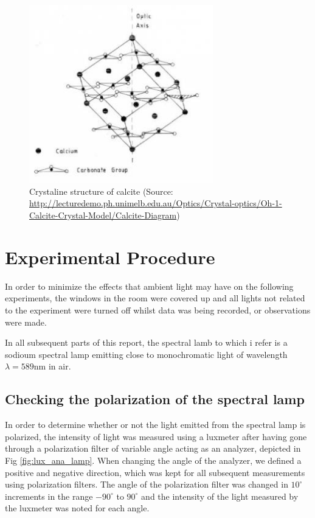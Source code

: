 \documentclass[11pt,a4paper, twocolumn]{article}
\begin{document}
    \begin{figure}[H]
      \center
      \includegraphics[width=8cm]{scripts/figs/calcite.jpg}
      \caption{Crystaline structure of calcite (Source: \url{http://lecturedemo.ph.unimelb.edu.au/Optics/Crystal-optics/Oh-1-Calcite-Crystal-Model/Calcite-Diagram})}
      \label{fig:calcite}
    \end{figure}

\section{\label{section:experimental}Experimental Procedure} 
  
  In order to minimize the effects that ambient light may have on the following experiments, the windows in the room were covered up and all lights not related to the experiment were turned off whilst data was being recorded, or observations were made.

  In all subsequent parts of this report, the spectral lamb to which i refer is a sodioum spectral lamp emitting close to monochromatic light of wavelength $\lambda=589$nm in air.

  \subsection{\label{subsect:polar_lamp}Checking the polarization of the spectral lamp}
    In order to determine whether or not the light emitted from the spectral lamp is polarized, the intensity of light was measured using a luxmeter\cite{data:luxmeter} after having gone through a polarization filter of variable angle acting as an analyzer, depicted in Fig \ref{fig:lux_ana_lamp}. When changing the angle of the analyzer, we defined a positive and negative direction, which was kept for all subsequent measurements using polarization filters. The angle of the polarization filter was changed in $10^\circ$ increments in the range $-90^\circ$ to $90^\circ$ and the intensity of the light measured by the luxmeter was noted for each angle.
\end{document}
